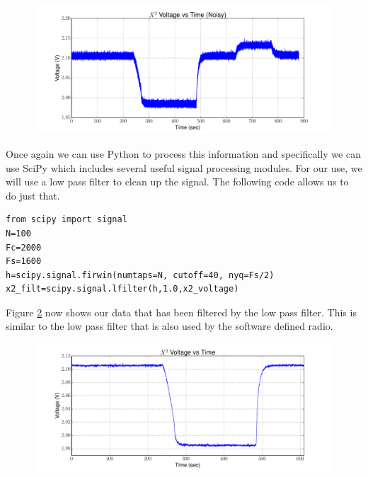 {\begin{figure}[h!tb] \centering
\includegraphics[width=\textwidth]{Experiments/Exp1/noisy_voltage.pdf}
\label{X2_Raw}
\end{figure}

Once again we can use Python to process this information and specifically we can use SciPy which includes several useful signal processing modules.  For our use, we will use a low pass filter to clean up the signal.  The following code allows us to do just that.

\begin{lstlisting}[frame=single,keywordstyle=\color{blue}]
from scipy import signal
N=100
Fc=2000
Fs=1600
h=scipy.signal.firwin(numtaps=N, cutoff=40, nyq=Fs/2)
x2_filt=scipy.signal.lfilter(h,1.0,x2_voltage)
\end{lstlisting}

Figure \ref{X2_filter} now shows our data that has been filtered by the low pass filter.  This is similar to the low pass filter that is also used by the software defined radio.

\begin{figure}[h!tb] \centering
\includegraphics[width=\textwidth]{Experiments/Exp1/x2_filter.pdf}
\label{X2_filter}
\end{figure}

}
